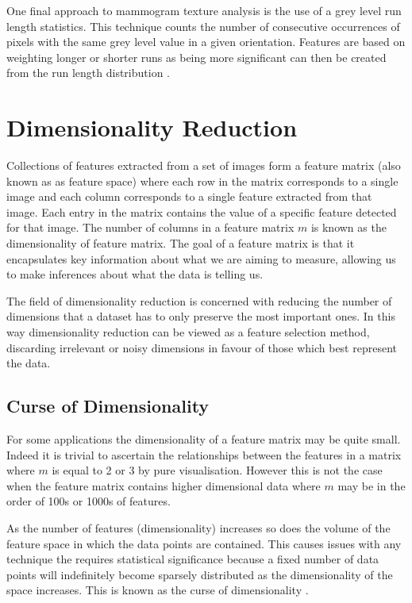 One final approach to mammogram texture analysis is the use of a grey level run length statistics. This technique counts the number of consecutive occurrences of pixels with the same grey level value in a given orientation. Features are based on weighting longer or shorter runs as being more significant can then be created from the run length distribution \cite{weszka1976comparative, cheng2006approaches}.  

\section{Dimensionality Reduction}
Collections of features extracted from a set of images form a feature matrix (also known as as feature space) where each row in the matrix corresponds to a single image and each column corresponds to a single feature extracted from that image. Each entry in the matrix contains the value of a specific feature detected for that image. The number of columns in a feature matrix $m$ is known as the dimensionality of feature matrix. The goal of a feature matrix is that it encapsulates key information about what we are aiming to measure, allowing us to make inferences about what the data is telling us.

The field of dimensionality reduction is concerned with reducing the number of dimensions that a dataset has to only preserve the most important ones. In this way dimensionality reduction can be viewed as a feature selection method, discarding irrelevant or noisy dimensions in favour of those which best represent the data.

\subsection{Curse of Dimensionality}
For some applications the dimensionality of a feature matrix may be quite small. Indeed it is trivial to ascertain the relationships between the features in a matrix where $m$ is equal to 2 or 3 by pure visualisation. However this is not the case when the feature matrix contains higher dimensional data where $m$ may be in the order of 100s or 1000s of features.

As the number of features (dimensionality) increases so does the volume of the feature space in which the data points are contained. This causes issues with any technique the requires statistical significance because a fixed number of data points will indefinitely become sparsely distributed as the dimensionality of the space increases. This is known as the curse of dimensionality \cite{bellman1965dynamic}.

